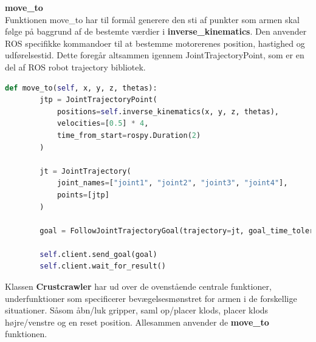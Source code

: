 \textbf{move\_to}\\
Funktionen move\_to har til formål generere den sti af punkter som armen skal følge på baggrund af de bestemte værdier i \textbf{inverse\_kinematics}. Den anvender ROS specifikke kommandoer til at bestemme motorerenes position, hastighed og udførelsestid. Dette foregår altsammen igennem JointTrajectoryPoint, som er en del af ROS robot trajectory bibliotek.\\

\begin{lstlisting}[caption=if sætning $q_4$, label=q4 bestemmelse, language=Python]
    def move_to(self, x, y, z, thetas):
        jtp = JointTrajectoryPoint(
            positions=self.inverse_kinematics(x, y, z, thetas),
            velocities=[0.5] * 4,
            time_from_start=rospy.Duration(2)
        )

        jt = JointTrajectory(
            joint_names=["joint1", "joint2", "joint3", "joint4"],
            points=[jtp]
        )

        goal = FollowJointTrajectoryGoal(trajectory=jt, goal_time_tolerance=rospy.Duration(4))

        self.client.send_goal(goal)
        self.client.wait_for_result()
\end{lstlisting}

Klassen \textbf{Crustcrawler} har ud over de ovenstående centrale funktioner, underfunktioner som specificerer bevægelsesmønstret for armen i de forskellige situationer. Såsom åbn/luk gripper, saml op/placer klods, placer klods højre/venstre og en reset position. Allesammen anvender de \textbf{move\_to} funktionen.